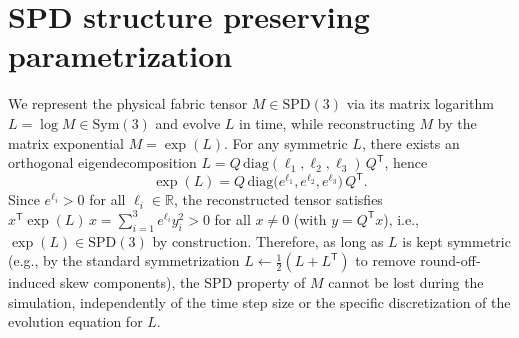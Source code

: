 \section*{SPD structure preserving parametrization}
We represent the physical fabric tensor $M\in\mathrm{SPD}(3)$ via its matrix logarithm
$L=\log M\in\mathrm{Sym}(3)$ and evolve $L$ in time, while reconstructing $M$ by the
matrix exponential $M=\exp(L)$. For any symmetric $L$, there exists an orthogonal
eigendecomposition $L=Q\,\mathrm{diag}(\ell_1,\ell_2,\ell_3)\,Q^{\mathsf T}$, hence
\[
\exp(L)=Q\,\mathrm{diag}\!\big(e^{\ell_1},e^{\ell_2},e^{\ell_3}\big)\,Q^{\mathsf T}.
\]
Since $e^{\ell_i}>0$ for all $\ell_i\in\mathbb{R}$, the reconstructed tensor satisfies
$x^{\mathsf T}\exp(L)\,x=\sum_{i=1}^3 e^{\ell_i} y_i^2>0$ for all $x\neq 0$ (with $y=Q^{\mathsf T}x$),
i.e., $\exp(L)\in\mathrm{SPD}(3)$ by construction. Therefore, as long as $L$ is kept symmetric
(e.g., by the standard symmetrization $L\leftarrow \tfrac12(L+L^{\mathsf T})$ to remove
round-off-induced skew components), the SPD property of $M$ cannot be lost during the simulation,
independently of the time step size or the specific discretization of the evolution equation for $L$.
